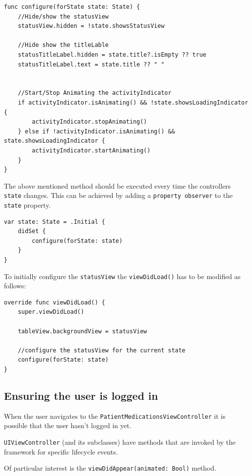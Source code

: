\documentclass{article}
\begin{document}
\begin{verbatim}
func configure(forState state: State) {
    //Hide/show the statusView
    statusView.hidden = !state.showsStatusView

    //Hide show the titleLable
    statusTitleLabel.hidden = state.title?.isEmpty ?? true
    statusTitleLabel.text = state.title ?? " "


    //Start/Stop Animating the activityIndicator
    if activityIndicator.isAnimating() && !state.showsLoadingIndicator {
        activityIndicator.stopAnimating()
    } else if !activityIndicator.isAnimating() && state.showsLoadingIndicator {
        activityIndicator.startAnimating()
    }
}
\end{verbatim}
The above mentioned method should be executed every time the controllers
\texttt{state} changes. This can be achieved by adding a
\texttt{property\ observer} to the \texttt{state} property.

\begin{verbatim}
var state: State = .Initial {
    didSet {
        configure(forState: state)
    }
}
\end{verbatim}
To initially configure the \texttt{statusView} the
\texttt{viewDidLoad()} has to be modified as follows:

\begin{verbatim}
override func viewDidLoad() {
    super.viewDidLoad()

    tableView.backgroundView = statusView

    //configure the statusView for the current state
    configure(forState: state)
}
\end{verbatim}
\subsection{Ensuring the user is logged in}\label{step-6.2---implementing-patientmedicationsviewcontroller---ensuring-the-user-is-logged-in}

When the user navigates to the \texttt{PatientMedicationsViewController}
it is possible that the user hasn't logged in yet.

\texttt{UIViewController} (and its subclasses) have methods that are
invoked by the framework for specific lifecycle events.

Of particular interest is the \texttt{viewDidAppear(animated:\ Bool)}
method.
\end{document}
